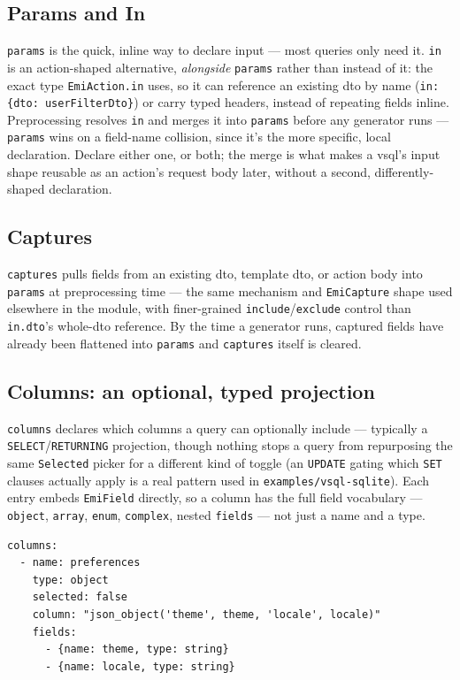 \subsection{Params and In}
\texttt{params} is the quick, inline way to declare input --- most
queries only need it. \texttt{in} is an action-shaped alternative,
\emph{alongside} \texttt{params} rather than instead of it: the exact
type \texttt{EmiAction.in} uses, so it can reference an existing dto by
name (\texttt{in: \{dto: userFilterDto\}}) or carry typed headers,
instead of repeating fields inline. Preprocessing resolves \texttt{in}
and merges it into \texttt{params} before any generator runs ---
\texttt{params} wins on a field-name collision, since it's the more
specific, local declaration. Declare either one, or both; the merge is
what makes a vsql's input shape reusable as an action's request body
later, without a second, differently-shaped declaration.

\subsection{Captures}
\texttt{captures} pulls fields from an existing dto, template dto, or
action body into \texttt{params} at preprocessing time --- the same
mechanism and \texttt{EmiCapture} shape used elsewhere in the module,
with finer-grained \texttt{include}/\texttt{exclude} control than
\texttt{in.dto}'s whole-dto reference. By the time a generator runs,
captured fields have already been flattened into \texttt{params} and
\texttt{captures} itself is cleared.

\subsection{Columns: an optional, typed projection}
\label{sec:vsql-columns}
\texttt{columns} declares which columns a query can optionally
include --- typically a \texttt{SELECT}/\texttt{RETURNING}
projection, though nothing stops a query from repurposing the same
\texttt{Selected} picker for a different kind of toggle (an
\texttt{UPDATE} gating which \texttt{SET} clauses actually apply is a
real pattern used in \texttt{examples/vsql-sqlite}). Each entry embeds
\texttt{EmiField} directly, so a column has the full field vocabulary
--- \texttt{object}, \texttt{array}, \texttt{enum}, \texttt{complex},
nested \texttt{fields} --- not just a name and a type.

\begin{lstlisting}
columns:
  - name: preferences
    type: object
    selected: false
    column: "json_object('theme', theme, 'locale', locale)"
    fields:
      - {name: theme, type: string}
      - {name: locale, type: string}
\end{lstlisting}


